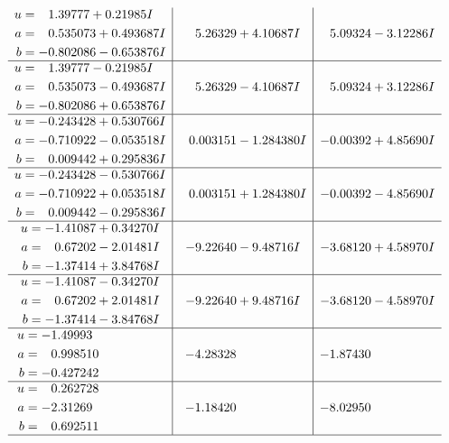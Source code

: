 \documentclass[1p]{elsarticle_modified}
\theoremstyle{definition}
\begin{document}
$$\begin{array}{c|c|c}
\begin{aligned}
u &= \phantom{-}1.39777 + 0.21985 I \\
a &= \phantom{-}0.535073 + 0.493687 I \\
b &= -0.802086 - 0.653876 I\end{aligned}
 & \phantom{-}5.26329 + 4.10687 I & \phantom{-}5.09324 - 3.12286 I \\ \hline\begin{aligned}
u &= \phantom{-}1.39777 - 0.21985 I \\
a &= \phantom{-}0.535073 - 0.493687 I \\
b &= -0.802086 + 0.653876 I\end{aligned}
 & \phantom{-}5.26329 - 4.10687 I & \phantom{-}5.09324 + 3.12286 I \\ \hline\begin{aligned}
u &= -0.243428 + 0.530766 I \\
a &= -0.710922 - 0.053518 I \\
b &= \phantom{-}0.009442 + 0.295836 I\end{aligned}
 & \phantom{-}0.003151 - 1.284380 I & -0.00392 + 4.85690 I \\ \hline\begin{aligned}
u &= -0.243428 - 0.530766 I \\
a &= -0.710922 + 0.053518 I \\
b &= \phantom{-}0.009442 - 0.295836 I\end{aligned}
 & \phantom{-}0.003151 + 1.284380 I & -0.00392 - 4.85690 I \\ \hline\begin{aligned}
u &= -1.41087 + 0.34270 I \\
a &= \phantom{-}0.67202 - 2.01481 I \\
b &= -1.37414 + 3.84768 I\end{aligned}
 & -9.22640 - 9.48716 I & -3.68120 + 4.58970 I \\ \hline\begin{aligned}
u &= -1.41087 - 0.34270 I \\
a &= \phantom{-}0.67202 + 2.01481 I \\
b &= -1.37414 - 3.84768 I\end{aligned}
 & -9.22640 + 9.48716 I & -3.68120 - 4.58970 I \\ \hline\begin{aligned}
u &= -1.49993\phantom{ +0.000000I} \\
a &= \phantom{-}0.998510\phantom{ +0.000000I} \\
b &= -0.427242\phantom{ +0.000000I}\end{aligned}
 & -4.28328\phantom{ +0.000000I} & -1.87430\phantom{ +0.000000I} \\ \hline\begin{aligned}
u &= \phantom{-}0.262728\phantom{ +0.000000I} \\
a &= -2.31269\phantom{ +0.000000I} \\
b &= \phantom{-}0.692511\phantom{ +0.000000I}\end{aligned}
 & -1.18420\phantom{ +0.000000I} & -8.02950\phantom{ +0.000000I}\\
 \hline 
 \end{array}$$\newpage\newpage\renewcommand{\arraystretch}{1}
\end{document}
